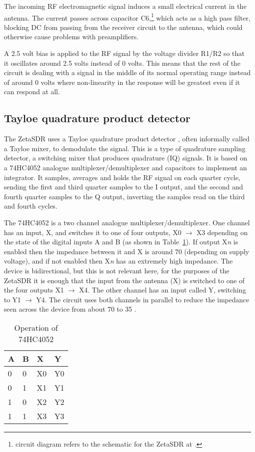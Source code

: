 \documentclass[11pt, twoside]{article}
\begin{document}
The incoming RF electromagnetic signal induces a small electrical
current in the antenna.  The current passes across capacitor
C6,\footnote{circuit diagram refers to the schematic for the ZetaSDR
  at \cite{ly1gp:2007}.} which acts as a high pass filter, blocking DC
from passing from the receiver circuit to the antenna, which could
otherwise cause problems with preamplifiers.

A 2.5 volt bias is applied to the RF signal by the voltage divider
R1/R2 so that it oscillates around 2.5 volts instead of 0 volts.  This
means that the rest of the circuit is dealing with a signal in the
middle of its normal operating range instead of around 0 volts where
non-linearity in the response will be greatest even if it can respond
at all.

\subsection{Tayloe quadrature product detector}

The ZetaSDR uses a Tayloe quadrature product detector
\citep{Tayloe:2001, Tayloe:2013}, often informally called a Tayloe
mixer, to demodulate the signal.  This is a type of quadrature
sampling detector, a switching mixer that produces quadrature (IQ)
signals. It is based on a 74HC4052 analogue multiplexer/demultiplexer
and capacitors to implement an integrator.  It samples, averages and
holds the RF signal on each quarter cycle, sending the first and third
quarter samples to the I output, and the second and fourth quarter
samples to the Q output, inverting the samples read on the third and
fourth cycles.

The 74HC4052 is a two channel analogue multiplexer/demultiplexer.  One
channel has an input, X, and switches it to one of four outputs, X0
$\rightarrow$ X3 depending on the state of the digital inputs A and B
(as shown in Table~\ref{table:74HC4052}).  If output X{\it n} is
enabled then the impedance between it and X is around 70 {\ohm}
(depending on supply voltage), and if not enabled then X{\it n} has an
extremely high impedance.  The device is bidirectional, but this is
not relevant here, for the purposes of the ZetaSDR it is enough that
the input from the antenna (X) is switched to one of the four outputs
X1 $\rightarrow$ X4. The other channel has an input called Y,
switching to Y1 $\rightarrow$ Y4.  The circuit uses both channels in
parallel to reduce the impedance seen across the device from about 70
{\ohm} to 35 {\ohm}.

\begin{table}[ht]
  \center
  \begin{tabular}{|l| l| l| l|}
    \hline
    A & B & X & Y  \\
    \hline
    \hline
    0 &0& X0& Y0\\
    0 &1& X1& Y1\\
    1 &0& X2& Y2\\
    1 &1& X3& Y3\\
    \hline
  \end{tabular}
  \caption{Operation of 74HC4052}
  \label{table:74HC4052}
\end{table}
\end{document}
